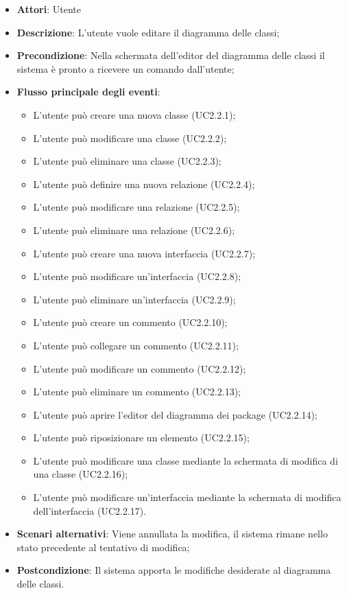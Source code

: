 \documentclass[../AnalisiDeiRequisiti.tex]{subfiles}
\begin{document}
	\begin{itemize}
		\item \textbf{Attori}: Utente
		\item \textbf{Descrizione}: L'utente vuole editare il diagramma delle classi;
		\item \textbf{Precondizione}: Nella schermata dell'editor del diagramma delle classi il sistema è pronto a ricevere un comando dall'utente;
		\item \textbf{Flusso principale degli eventi}: \begin{itemize}
			\item L'utente può creare una nuova classe (UC2.2.1);
			\item L'utente può modificare una classe (UC2.2.2);
			\item L'utente può eliminare una classe (UC2.2.3);
			\item L'utente può definire una nuova relazione (UC2.2.4);
			\item L'utente può modificare una relazione (UC2.2.5);
			\item L'utente può eliminare una relazione (UC2.2.6);
			\item L'utente può creare una nuova interfaccia (UC2.2.7);
			\item L'utente può modificare un'interfaccia (UC2.2.8);
			\item L'utente può eliminare un'interfaccia (UC2.2.9);
			\item L'utente può creare un commento (UC2.2.10);
			\item L'utente può collegare un commento (UC2.2.11);
			\item L'utente può modificare un commento (UC2.2.12);
			\item L'utente può eliminare un commento (UC2.2.13);
			\item L'utente può aprire l'editor del diagramma dei package (UC2.2.14);
			\item L'utente può riposizionare un elemento (UC2.2.15);
			\item L'utente può modificare una classe mediante la schermata di modifica di una classe (UC2.2.16);
			\item L'utente può modificare un'interfaccia mediante la schermata di modifica dell'interfaccia (UC2.2.17).
		\end{itemize}
		\item \textbf{Scenari alternativi}: Viene annullata la modifica, il sistema rimane nello stato precedente al tentativo di modifica;
		\item \textbf{Postcondizione}: Il sistema apporta le modifiche desiderate al diagramma delle classi.
	\end{itemize}
\end{document}
